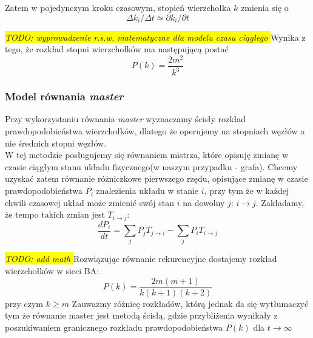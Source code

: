 \documentclass{article}
\newcommand{\todo}[1]{
	\colorbox{yellow} {{\color{red}
	\emph {TODO: #1}
}}}
\begin{document}
	Zatem w pojedynczym kroku czasowym, stopień wierzchołka $k$ zmienia się o
	\begin{equation}
	\Delta k_i/\Delta t \simeq \partial k_i / \partial t
	\end{equation}
		\todo{wyprowadzenie r.s.w. matematyczne dla modelu czasu ciągłego}
	Wynika z tego, że rozkład stopni wierzchołków ma następującą postać
	\begin{equation}
	P(k) = \frac{2m^2}{k^3}
	\end{equation}
\subsubsection{Model równania \textit{master}}
	Przy wykorzystaniu równania \textit{master} wyznaczamy ścisły rozkład prawdopodobieństwa wierzchołków, dlatego że operujemy na stopniach węzłów a nie średnich stopni węzłów.\\W tej metodzie posługujemy się równaniem mistrza, które opisuję zmianę w czasie ciągłym  stanu układu fizycznego(w naszym przypadku - grafa). Chcemy uzyskać zatem równanie różniczkowe pierwszego rzędu, opisujące zmianę w czasie prawdopodobieństwa $P_i$ znalezienia układu w stanie $i$, przy tym że w każdej chwili czasowej układ może zmienić swój stan $i$ na dowolny $j$: $ i \rightarrow j$. Zakładamy, że tempo takich zmian jest $T_{i \rightarrow j}$:
	\begin{equation}
	\frac{dP_i}{dt} = \sum_{j} P_jT_{j \rightarrow i} - \sum_{j} P_iT_{i \rightarrow j}
	\end{equation}
	\todo{add math}
	Rozwiązując równanie rekurencyjne dostajemy rozkład wierzchołków w sieci BA:
	\begin{equation}
		P(k) = \frac{2m(m + 1)}{k(k + 1)(k + 2)}
	\end{equation}
	przy czym $k \geq m$
Zauważmy różnicę rozkładów, którą jednak da się wytłumaczyć tym że równanie master jest metodą ścisłą, gdzie przybliżenia wynikały z poszukiwaniem granicznego rozkładu prawdopodobieństwa $P(k)$ dla $t \rightarrow \infty$
{}

\end{document}
